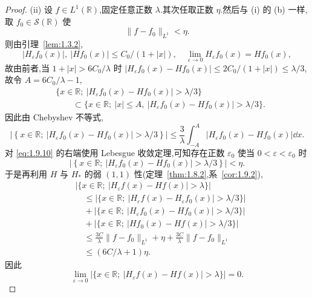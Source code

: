 \begin{proof}
(ii) 设 $f \in L^{1}(\mathbb{R})$,固定任意正数 $\lambda$.其次任取正数 $\eta$.然后与 (i) 的 (b) 一样,取 $f_{0} \in \mathcal{S}(\mathbb{R})$ 使
\begin{equation*}
\| f - f_{0} \|_{L^{1}} < \eta.
\end{equation*}
则由引理~\ref{lem:1.3.2},
\begin{equation}\tag{1.9.10}
|H_{\varepsilon}f_{0}(x)|,\ |Hf_{0}(x)| \leq C_{0}/(1 + |x|), \quad \lim_{\varepsilon \to 0}H_{\varepsilon}f_{0}(x) = Hf_{0}(x),
\label{eq:1.9.10}\end{equation}
故由前者,当 $1 + |x| > 6C_{0}/\lambda$ 时 $|H_{\varepsilon}f_{0}(x) - Hf_{0}(x)| \leq 2C_{0}/(1 + |x|) \leq \lambda/3$,故令 $A = 6C_{0}/\lambda - 1$,
\begin{align*}
& \{x \in \mathbb{R};\ |H_{\varepsilon}f_{0}(x) - Hf_{0}(x)| > \lambda/3\} \\
& \qquad \subset \{x \in \mathbb{R};\ |x| \leq A,\ |H_{\varepsilon}f_{0}(x) - Hf_{0}(x)| > \lambda/3\}.
\end{align*}
因此由 Chebyshev 不等式,
\begin{equation*}
\left|\left\{x \in \mathbb{R};\ \left|H_{\varepsilon}f_{0}(x) - Hf_{0}(x)\right| > \lambda/3\right\}\right| \leq \frac{3}{\lambda}\int_{-A}^{A}\left|H_{\varepsilon}f_{0}(x) - Hf_{0}(x)\right|\dd x.
\end{equation*}
对 \eqref{eq:1.9.10} 的右端使用 Lebesgue 收敛定理,可知存在正数 $\varepsilon_{0}$ 使当 $0 < \varepsilon < \varepsilon_{0}$ 时
\begin{equation*}
\left|\left\{x \in \mathbb{R};\ \left|H_{\varepsilon}f_{0}(x) - Hf_{0}(x)\right| > \lambda/3\right\}\right| < \eta.
\end{equation*}
于是再利用 $H$ 与 $H_{*}$ 的弱 $(1,1)$ 性(定理~\ref{thm:1.8.2},系~\ref{cor:1.9.2}),
\begin{align*}
& |\{x \in \mathbb{R};\ |H_{\varepsilon}f(x) - Hf(x)| > \lambda\}| \\
& \quad \leq |\{x \in \mathbb{R};\ |H_{\varepsilon}f(x) - H_{\varepsilon}f_{0}(x)| > \lambda/3\}| \\
& \quad + |\{x \in \mathbb{R};\ |H_{\varepsilon}f_{0}(x) - Hf_{0}(x)| > \lambda/3\}| \\
& \quad + |\{x \in \mathbb{R};\ |Hf_{0}(x) - Hf(x)| > \lambda/3\}| \\
& \quad \leq \frac{3C}{\lambda}\| f - f_{0} \|_{L^{1}} + \eta + \frac{3C}{\lambda}\| f - f_{0} \|_{L^{1}} \\
& \quad \leq (6C/\lambda + 1)\eta.
\end{align*}
因此
\begin{equation*}
\lim_{\varepsilon \to 0}|\{x \in \mathbb{R};\ |H_{\varepsilon}f(x) - Hf(x)| > \lambda\}| = 0.
\end{equation*}
\end{proof}

